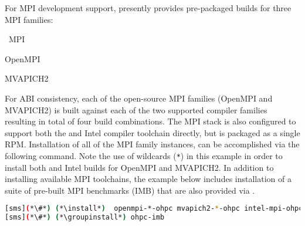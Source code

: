 For MPI development support, \OHPC{} presently provides pre-packaged builds for
three MPI families: 

\begin{itemize*}
\item \Intel{}~MPI
\item OpenMPI
\item MVAPICH2
\end{itemize*}
 For ABI consistency, each of the open-source MPI families (OpenMPI and
 MVAPICH2) is built against each of the two supported compiler families
 resulting in total of four build combinations.  The \Intel{} MPI stack is also
 configured to support both the \GNU{} and Intel compiler toolchain directly, but
 is packaged as a single RPM. Installation of all of the MPI family instances,
 can be accomplished via the following command. Note the use of wildcards
 (\texttt{*}) in this example in order to install both \GNU{} and Intel builds for
 OpenMPI and MVAPICH2. In addition to installing available MPI toolchains,
 the example below includes installation of a suite of pre-built MPI
 benchmarks (IMB) that are also provided via \OHPC{}.

\begin{lstlisting}[language=bash]
[sms](*\#*) (*\install*)  openmpi-*-ohpc mvapich2-*-ohpc intel-mpi-ohpc
[sms](*\#*) (*\groupinstall*) ohpc-imb
\end{lstlisting}
